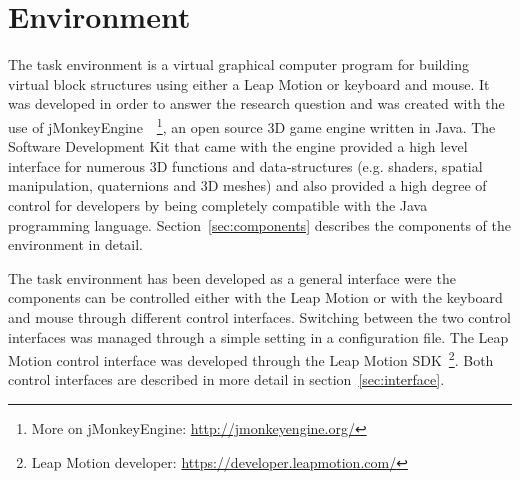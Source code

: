 \section{Environment}


The task environment is a virtual graphical computer program for building virtual block structures using either a Leap Motion or keyboard and mouse. It was developed in order 
to answer the research question and was created with the use of jMonkeyEngine~\cite{Irene:2012}~\footnote{More on jMonkeyEngine: \url{http://jmonkeyengine.org/}}, an open source 
3D game engine written in Java. The Software Development Kit that came with the engine provided a high level interface for numerous 3D functions and data-structures (e.g. shaders, 
spatial manipulation, quaternions and 3D meshes) and also provided a high degree of control for developers by being completely compatible with the Java programming language. 
Section~\ref{sec:components} describes the components of the environment in detail.

The task environment has been developed as a general interface were the components can be controlled either with the Leap Motion or with the keyboard and mouse through different 
control interfaces. Switching between the two control interfaces was managed through a simple setting in a configuration file. The Leap Motion control interface was developed through 
the Leap Motion SDK~\footnote{Leap Motion developer: \url{https://developer.leapmotion.com/}}. Both control interfaces are described in more detail in section~\ref{sec:interface}.





